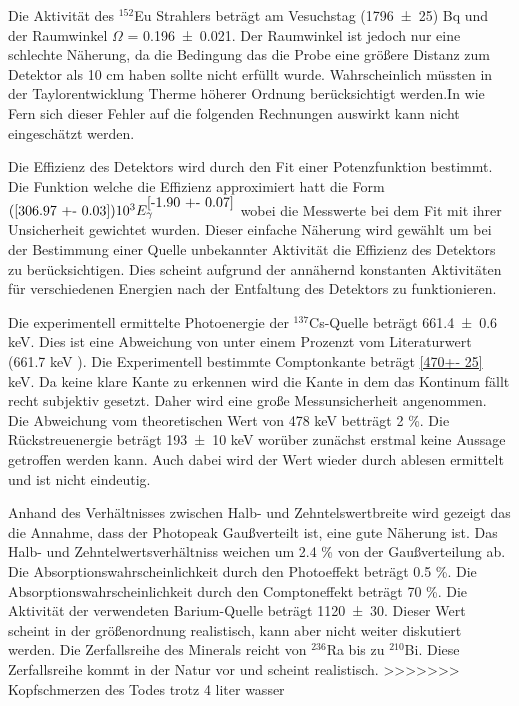 Die Aktivität des $^{152}$Eu Strahlers beträgt am Vesuchstag (\num{1796 +- 25}) Bq und der Raumwinkel $\Omega$ = \num{0.196 +- 0.021}. Der Raumwinkel ist jedoch nur eine schlechte Näherung, da die Bedingung das die Probe eine größere Distanz zum Detektor als 10 cm haben sollte nicht erfüllt wurde. Wahrscheinlich müssten in der Taylorentwicklung Therme höherer Ordnung berücksichtigt werden.In wie Fern sich dieser Fehler auf die folgenden Rechnungen auswirkt kann nicht eingeschätzt werden.

Die Effizienz des Detektors wird durch den Fit einer Potenzfunktion bestimmt. Die Funktion welche die Effizienz approximiert hatt die Form $(\ref{306.97 +- 0.03})10^3 E_\gamma^{\ref{-1.90 +- 0.07}}$ wobei die Messwerte bei dem Fit mit ihrer Unsicherheit gewichtet wurden. Dieser einfache Näherung wird gewählt um bei der Bestimmung einer Quelle unbekannter Aktivität die Effizienz des Detektors zu berücksichtigen. Dies scheint aufgrund der annähernd konstanten Aktivitäten für verschiedenen Energien nach der Entfaltung des Detektors zu funktionieren.  

Die experimentell ermittelte Photoenergie der $^{137}$Cs-Quelle beträgt \num{661.4 +- 0.6} keV. Dies ist eine Abweichung von unter einem Prozenzt vom Literaturwert (661.7 keV \cite{Cs}). Die Experimentell bestimmte Comptonkante beträgt \ref{470+- 25} keV. Da keine klare Kante zu erkennen wird die Kante in dem das Kontinum fällt recht subjektiv gesetzt. Daher wird eine große Messunsicherheit angenommen. Die Abweichung vom theoretischen Wert von 478 keV betträgt 2 \%. Die Rückstreuenergie beträgt \num{193+- 10} keV worüber zunächst erstmal keine Aussage getroffen werden kann. Auch dabei wird der Wert wieder durch ablesen ermittelt und ist nicht eindeutig.  

Anhand des Verhältnisses zwischen Halb- und Zehntelswertbreite wird gezeigt das die Annahme, dass der Photopeak Gaußverteilt ist, eine gute Näherung ist. Das Halb- und Zehntelwertsverhältniss weichen um 2.4 \% von der Gaußverteilung ab. Die Absorptionswahrscheinlichkeit durch den Photoeffekt beträgt 0.5 \%. Die Absorptionswahrscheinlichkeit durch den Comptoneffekt beträgt 70 \%. Die Aktivität der verwendeten Barium-Quelle beträgt \num{1120 +- 30}. Dieser Wert scheint in der größenordnung realistisch, kann aber nicht weiter diskutiert werden. Die Zerfallsreihe des Minerals reicht von $^{236}$Ra bis zu $^{210}$Bi. Diese Zerfallsreihe kommt in der Natur vor und scheint realistisch.
>>>>>>> Kopfschmerzen des Todes trotz 4 liter wasser
